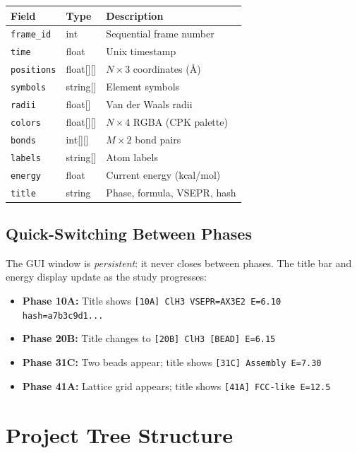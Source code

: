 \documentclass[11pt,a4paper]{article}
\begin{document}
\begin{center}
\begin{tabular}{lll}
\toprule
\textbf{Field} & \textbf{Type} & \textbf{Description} \\
\midrule
\texttt{frame\_id}  & int       & Sequential frame number \\
\texttt{time}       & float     & Unix timestamp \\
\texttt{positions}  & float[][] & $N \times 3$ coordinates (\AA) \\
\texttt{symbols}    & string[]  & Element symbols \\
\texttt{radii}      & float[]   & Van der Waals radii \\
\texttt{colors}     & float[][] & $N \times 4$ RGBA (CPK palette) \\
\texttt{bonds}      & int[][]   & $M \times 2$ bond pairs \\
\texttt{labels}     & string[]  & Atom labels \\
\texttt{energy}     & float     & Current energy (kcal/mol) \\
\texttt{title}      & string    & Phase, formula, VSEPR, hash \\
\bottomrule
\end{tabular}
\end{center}

\subsection{Quick-Switching Between Phases}

The GUI window is \emph{persistent}: it never closes between phases.
The title bar and energy display update as the study progresses:

\begin{itemize}
  \item \textbf{Phase 10A:} Title shows \texttt{[10A] ClH3 VSEPR=AX3E2
        E=6.10 hash=a7b3c9d1...}
  \item \textbf{Phase 20B:} Title changes to \texttt{[20B] ClH3 [BEAD]
        E=6.15}
  \item \textbf{Phase 31C:} Two beads appear; title shows
        \texttt{[31C] Assembly E=7.30}
  \item \textbf{Phase 41A:} Lattice grid appears; title shows
        \texttt{[41A] FCC-like E=12.5}
\end{itemize}

\section{Project Tree Structure}
\label{sec:tree}
\end{document}

